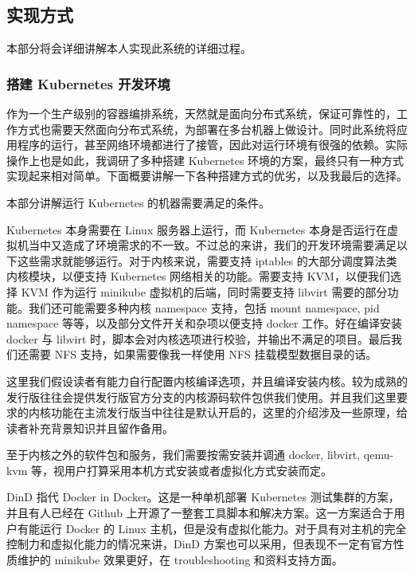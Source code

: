 \subsection{实现方式}

本部分将会详细讲解本人实现此系统的详细过程。

\subsubsection{搭建 Kubernetes 开发环境}

作为一个生产级别的容器编排系统，天然就是面向分布式系统，保证可靠性的，工作方式也需要天然面向分布式系统，为部署在多台机器上做设计。同时此系统将应用程序的运行，甚至网络环境都进行了接管，因此对运行环境有很强的依赖。实际操作上也是如此，我调研了多种搭建 Kubernetes 环境的方案，最终只有一种方式实现起来相对简单。下面概要讲解一下各种搭建方式的优劣，以及我最后的选择。


本部分讲解运行 Kubernetes 的机器需要满足的条件。

Kubernetes 本身需要在 Linux 服务器上运行，而 Kubernetes 本身是否运行在虚拟机当中又造成了环境需求的不一致。不过总的来讲，我们的开发环境需要满足以下这些需求就能够运行。对于内核来说，需要支持 iptables 的大部分调度算法类内核模块，以便支持 Kubernetes 网络相关的功能。需要支持 KVM，以便我们选择 KVM 作为运行 minikube 虚拟机的后端，同时需要支持 libvirt 需要的部分功能。我们还可能需要多种内核 namespace 支持，包括 mount namespace, pid namespace 等等，以及部分文件开关和杂项以便支持 docker 工作。好在编译安装 docker 与 libvirt 时，脚本会对内核选项进行校验，并输出不满足的项目。最后我们还需要 NFS 支持，如果需要像我一样使用 NFS 挂载模型数据目录的话。

这里我们假设读者有能力自行配置内核编译选项，并且编译安装内核。较为成熟的发行版往往会提供发行版官方分支的内核源码软件包供我们使用。并且我们这里要求的内核功能在主流发行版当中往往是默认开启的，这里的介绍涉及一些原理，给读者补充背景知识并且留作备用。

至于内核之外的软件包和服务，我们需要按需安装并调通 docker, libvirt, qemu-kvm 等，视用户打算采用本机方式安装或者虚拟化方式安装而定。


DinD 指代 Docker in Docker。这是一种单机部署 Kubernetes 测试集群的方案，并且有人已经在 Github 上开源了一整套工具脚本和解决方案。这一方案适合于用户有能运行 Docker 的 Linux 主机，但是没有虚拟化能力。对于具有对主机的完全控制力和虚拟化能力的情况来讲，DinD 方案也可以采用，但表现不一定有官方性质维护的 minikube 效果更好，在 troubleshooting 和资料支持方面。

